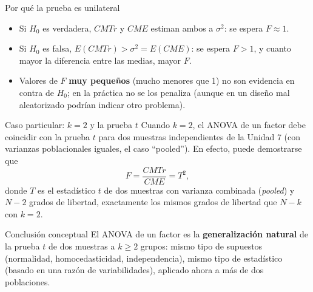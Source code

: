 \documentclass[aspectratio=169,11pt]{beamer}
\begin{document}
\begin{frame}{Por qué la prueba es unilateral}
\begin{itemize}
\item Si $H_0$ es verdadera, $CMTr$ y $CME$ estiman ambos a $\sigma^2$: se espera $F\approx 1$.
\item Si $H_0$ es falsa, $E(CMTr) > \sigma^2 = E(CME)$: se espera $F>1$, y cuanto mayor la diferencia entre las medias, mayor $F$.
\item Valores de $F$ \textbf{muy pequeños} (mucho menores que 1) no son evidencia en contra de $H_0$; en la práctica no se los penaliza (aunque en un diseño mal aleatorizado podrían indicar otro problema).
\end{itemize}

\begin{center}
\end{center}
\end{frame}

\begin{frame}{Caso particular: $k=2$ y la prueba $t$}
Cuando $k=2$, el ANOVA de un factor debe coincidir con la prueba $t$ para dos muestras independientes de la Unidad 7 (con varianzas poblacionales iguales, el caso ``pooled''). En efecto, puede demostrarse que
\[
F = \frac{CMTr}{CME} = T^2,
\]
donde $T$ es el estadístico $t$ de dos muestras con varianza combinada (\emph{pooled}) y $N-2$ grados de libertad, exactamente los mismos grados de libertad que $N-k$ con $k=2$.

\begin{block}{Conclusión conceptual}
El ANOVA de un factor es la \textbf{generalización natural} de la prueba $t$ de dos muestras a $k\geq2$ grupos: mismo tipo de supuestos (normalidad, homocedasticidad, independencia), mismo tipo de estadístico (basado en una razón de variabilidades), aplicado ahora a más de dos poblaciones.
\end{block}
\end{frame}
\end{document}
